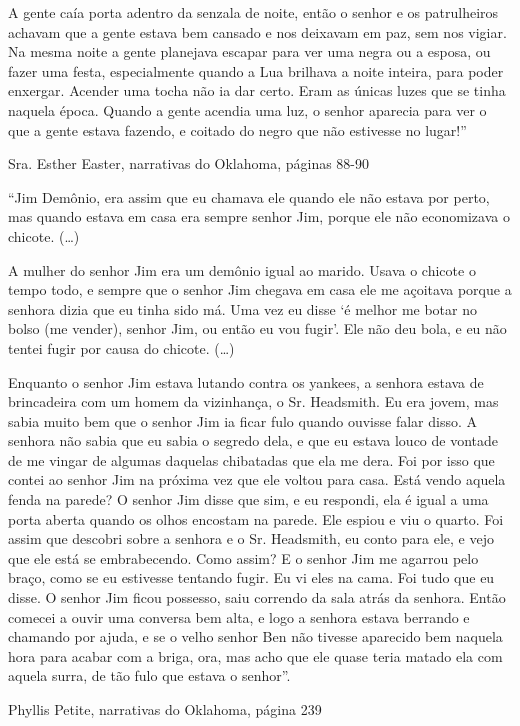A gente caía porta adentro da senzala de noite, então o senhor e os
patrulheiros achavam que a gente estava bem cansado e nos deixavam em
paz, sem nos vigiar. Na mesma noite a gente planejava escapar para ver
uma negra ou a esposa, ou fazer uma festa, especialmente quando a Lua
brilhava a noite inteira, para poder enxergar. Acender uma tocha não ia
dar certo. Eram as únicas luzes que se tinha naquela época. Quando a
gente acendia uma luz, o senhor aparecia para ver o que a gente estava
fazendo, e coitado do negro que não estivesse no lugar!''

Sra. Esther Easter, narrativas do Oklahoma, páginas 88-90

``Jim Demônio, era assim que eu chamava ele quando ele não estava por
perto, mas quando estava em casa era sempre senhor Jim, porque ele não
economizava o chicote. (\ldots{})

A mulher do senhor Jim era um demônio igual ao marido. Usava o chicote o
tempo todo, e sempre que o senhor Jim chegava em casa ele me açoitava
porque a senhora dizia que eu tinha sido má. Uma vez eu disse `é melhor
me botar no bolso (me vender), senhor Jim, ou então eu vou fugir'. Ele
não deu bola, e eu não tentei fugir por causa do chicote. (\ldots{})

Enquanto o senhor Jim estava lutando contra os yankees, a senhora estava
de brincadeira com um homem da vizinhança, o Sr. Headsmith. Eu era
jovem, mas sabia muito bem que o senhor Jim ia ficar fulo quando ouvisse
falar disso. A senhora não sabia que eu sabia o segredo dela, e que eu
estava louco de vontade de me vingar de algumas daquelas chibatadas que
ela me dera. Foi por isso que contei ao senhor Jim na próxima vez que
ele voltou para casa. Está vendo aquela fenda na parede? O senhor Jim
disse que sim, e eu respondi, ela é igual a uma porta aberta quando os
olhos encostam na parede. Ele espiou e viu o quarto. Foi assim que
descobri sobre a senhora e o Sr. Headsmith, eu conto para ele, e vejo
que ele está se embrabecendo. Como assim? E o senhor Jim me agarrou pelo
braço, como se eu estivesse tentando fugir. Eu vi eles na cama. Foi tudo
que eu disse. O senhor Jim ficou possesso, saiu correndo da sala atrás
da senhora. Então comecei a ouvir uma conversa bem alta, e logo a
senhora estava berrando e chamando por ajuda, e se o velho senhor Ben
não tivesse aparecido bem naquela hora para acabar com a briga, ora, mas
acho que ele quase teria matado ela com aquela surra, de tão fulo que
estava o senhor''.

Phyllis Petite, narrativas do Oklahoma, página 239

